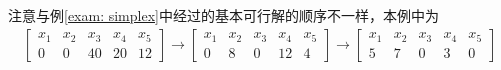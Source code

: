 \documentclass{ctexart}
\begin{document}
\begin{remark}
    注意与例\ref{exam: simplex}中经过的基本可行解的顺序不一样，本例中为
    \begin{align*}
        \begin{bmatrix}
            x_1 & x_2 & x_3 & x_4 & x_5 \\
            0   & 0   & 40  & 20  & 12
        \end{bmatrix} \longrightarrow
        \begin{bmatrix}
            x_1 & x_2 & x_3 & x_4 & x_5 \\
            0   & 8   & 0   & 12  & 4
        \end{bmatrix} \longrightarrow
        \begin{bmatrix}
            x_1 & x_2 & x_3 & x_4 & x_5 \\
            5   & 7   & 0   & 3   & 0
        \end{bmatrix}
    \end{align*}
\end{remark}
\end{document}
